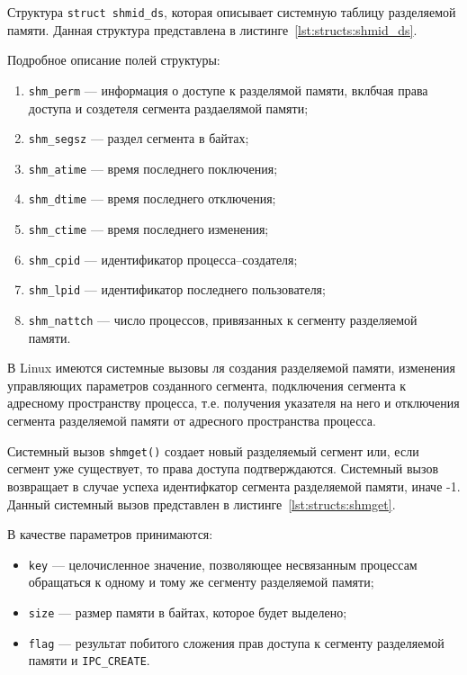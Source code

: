 Структура \texttt{struct shmid\_ds}, которая описывает системную таблицу разделяемой памяти. Данная структура представлена в листинге~\ref{lst:structs:shmid_ds}.



Подробное описание полей структуры:
\begin{enumerate}
	\item \texttt{shm\_perm} ---  информация о доступе к разделямой памяти, вклбчая права доступа и создетеля сегмента раздаелямой памяти;
	\item \texttt{shm\_segsz} --- раздел сегмента в байтах;
	\item \texttt{shm\_atime} --- время последнего поключения;
	\item \texttt{shm\_dtime} --- время последнего отключения;
	\item \texttt{shm\_ctime} --- время последнего изменения;
	\item \texttt{shm\_cpid} --- идентификатор процесса--создателя;
	\item \texttt{shm\_lpid} --- идентификатор последнего пользователя;
	\item \texttt{shm\_nattch} --- число процессов, привязанных к сегменту разделяемой памяти.
\end{enumerate}

В Linux имеются системные вызовы ля создания разделяемой памяти, изменения управляющих параметров созданного сегмента, подключения сегмента к адресному пространству процесса, т.е. получения указателя на него и отключения сегмента разделяемой памяти от адресного пространства процесса. 

Системный вызов \texttt{shmget()} создает новый разделяемый сегмент или, если сегмент уже существует, то права доступа подтверждаются.
Системный вызов возвращает в случае успеха идентифкатор сегмента разделяемой памяти, иначе -1. 
Данный системный вызов представлен в листинге~\ref{lst:structs:shmget}. 



В качестве параметров принимаются:
\begin{itemize}
	\item \texttt{key} --- целочисленное значение, позволяющее несвязанным процессам обращаться к одному и тому же сегменту разделяемой памяти;
	\item \texttt{size} --- размер памяти в байтах, которое будет выделено;
	\item \texttt{flag} --- результат побитого сложения прав доступа к сегменту разделяемой памяти и \texttt{IPC\_CREATE}.
\end{itemize}

